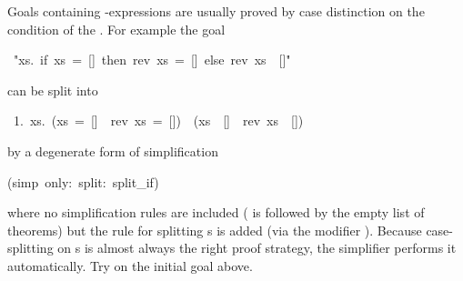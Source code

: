 \begin{isabelle}%
%
\begin{isamarkuptext}%
Goals containing -expressions are usually proved by case
distinction on the condition of the . For example the goal%
\end{isamarkuptext}%
~{"}{\isasymforall}xs.~if~xs~=~[]~then~rev~xs~=~[]~else~rev~xs~{\isasymnoteq}~[]{"}%
\begin{isamarkuptxt}%
\noindent
can be split into
\begin{isabellepar}%
~1.~{\isasymforall}xs.~(xs~=~[]~{\isasymlongrightarrow}~rev~xs~=~[])~{\isasymand}~(xs~{\isasymnoteq}~[]~{\isasymlongrightarrow}~rev~xs~{\isasymnoteq}~[])%
\end{isabellepar}%
by a degenerate form of simplification%
\end{isamarkuptxt}%
(simp~only:~split:~split\_if)%
\begin{isamarkuptext}%
\noindent
where no simplification rules are included ( is followed by the
empty list of theorems) but the rule  for
splitting s is added (via the modifier ). Because
case-splitting on s is almost always the right proof strategy, the
simplifier performs it automatically. Try 
on the initial goal above.


\end{isamarkuptext}
\end{isabelle}

